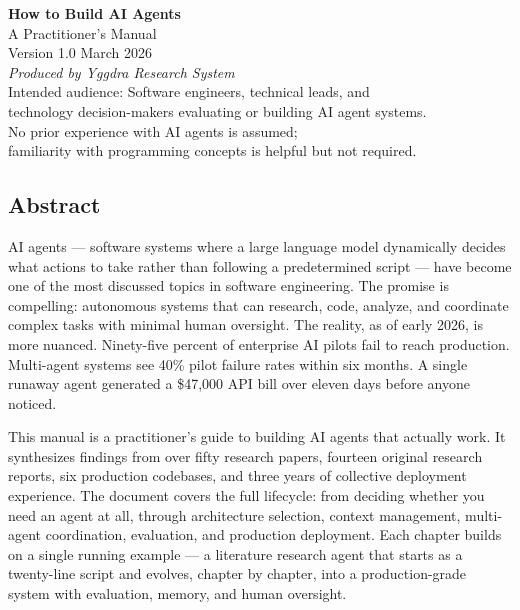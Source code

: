 \documentclass[11pt, a4paper]{article}
\begin{document}
\begin{titlepage}
\vspace*{3cm}
\begin{center}
{\Huge\bfseries\color{darkblue} How to Build AI Agents}\\[0.8em]
{\Large A Practitioner's Manual}\\[2em]
{\large Version 1.0 \quad\textperiodcentered\quad March 2026}\\[3em]
{\normalsize\textit{Produced by Yggdra Research System}}\\[1em]
{\small Intended audience: Software engineers, technical leads, and\\
technology decision-makers evaluating or building AI agent systems.\\
No prior experience with AI agents is assumed;\\
familiarity with programming concepts is helpful but not required.}
\end{center}
\vfill
\end{titlepage}

\hypertarget{abstract}{%
\subsection{Abstract}\label{abstract}}

AI agents --- software systems where a large language model dynamically
decides what actions to take rather than following a predetermined
script --- have become one of the most discussed topics in software
engineering. The promise is compelling: autonomous systems that can
research, code, analyze, and coordinate complex tasks with minimal human
oversight. The reality, as of early 2026, is more nuanced. Ninety-five
percent of enterprise AI pilots fail to reach production. Multi-agent
systems see 40\% pilot failure rates within six months. A single runaway
agent generated a \$47,000 API bill over eleven days before anyone
noticed.

This manual is a practitioner's guide to building AI agents that
actually work. It synthesizes findings from over fifty research papers,
fourteen original research reports, six production codebases, and three
years of collective deployment experience. The document covers the full
lifecycle: from deciding whether you need an agent at all, through
architecture selection, context management, multi-agent coordination,
evaluation, and production deployment. Each chapter builds on a single
running example --- a literature research agent that starts as a
twenty-line script and evolves, chapter by chapter, into a
production-grade system with evaluation, memory, and human oversight.
\end{document}
